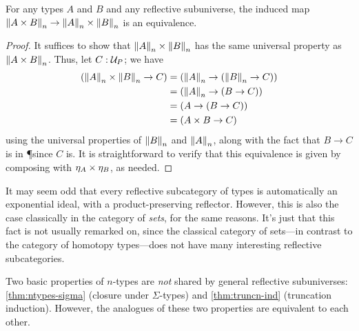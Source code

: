 \begin{cor}\label{cor:trunc_prod}
  For any types $A$ and $B$ and any reflective subuniverse, the induced map $\reflect(A\times B) \to \reflect(A) \times \reflect(B)$ is an equivalence.
\end{cor}
\begin{proof}
  It suffices to show that $\reflect(A) \times \reflect(B)$ has the same universal property as $\reflect(A\times B)$.
  Thus, let $C:\P$; we have
  \begin{align*}
    (\reflect(A) \times \reflect(B) \to C)
    &= (\reflect(A) \to (\reflect(B) \to C))\\
    &= (\reflect(A) \to (B \to C))\\
    &= (A \to (B \to C))\\
    &= (A \times B \to C)
  \end{align*}
  using the universal properties  of $\reflect(B)$ and $\reflect(A)$, along with the fact that $B\to C$ is in \P since $C$ is.
  It is straightforward to verify that this equivalence is given by composing with $\mreturn_A \times \mreturn_B$, as needed.
\end{proof}

It may seem odd that every reflective subcategory of types is automatically an exponential ideal, with a product-preserving reflector.
However, this is also the case classically in the category of \emph{sets}, for the same reasons.
It's just that this fact is not usually remarked on, since the classical category of sets---in contrast to the category of homotopy
types---does not have many interesting reflective subcategories.

Two basic properties of $n$-types are \emph{not} shared by general reflective subuniverses: \autoref{thm:ntypes-sigma} (closure under $\Sigma$-types) and \autoref{thm:truncn-ind} (truncation induction).
However, the analogues of these two properties are equivalent to each other.


